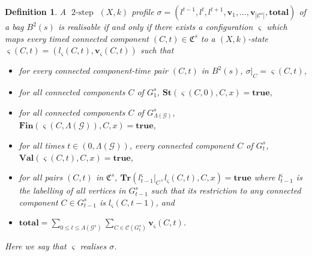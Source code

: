 \documentclass[a4paper,UKenglish,cleveref, autoref, thm-restate]{lipics-v2021} %
\DeclareMathOperator{\twostep}{2-step}
\newcounter{ctheorem}
\newtheorem{defn}[ctheorem]{Definition}
\begin{document}
\begin{toappendix}
\begin{defn}\label{def:realisable}
    A $\twostep$ $(X,k)$ profile $\sigma=(l^{t-1}, l^t, l^{t+1}, \textbf{v}_{1},\ldots,\textbf{v}_{|\mathcal{C}^s|}, \textbf{total})$ of a bag $B^2(s)$ is \emph{realisable} if and only if there exists a configuration $\varsigma$ which maps every timed connected component $(C,t)\in \mathfrak{C}^s$ to a $(X,k)$-state $\varsigma(C,t)=(l_{\varsigma}(C,t),\textbf{v}_{\varsigma}(C,t))$
    such that
    \begin{itemize}
        \item for every connected component-time pair $(C,t)$ in $B^2(s)$, $\sigma|_C=\varsigma(C,t)$,
        \item for all connected components $C$ of $G_1^s$, $\textbf{St}(\varsigma(C,0),C,x)=\textbf{true}$,
        \item for all connected components $C$ of $G^s_{\Lambda(\mathcal{G})}$, $\textbf{Fin}(\varsigma(C,\Lambda(\mathcal{G})),C,x)=\textbf{true}$,
        \item for all times $t\in(0,\Lambda(\mathcal{G}))$, every connected component $C$ of $G_{t}^s$, $\textbf{Val}(\varsigma(C,t),C,x)=\textbf{true}$,
        \item for all pairs $(C,t)$ in $\mathfrak{C}^s$, $\textbf{Tr}(l^{\varsigma}_{t-1}|_C,l_{\varsigma}(C,t),C,x)=\textbf{true}$ where $l^{\varsigma}_{t-1}$ is the labelling of all vertices in $G^s_{t-1}$ such that its restriction to any connected component $C\in G_{t-1}^s$ is $l_{\varsigma}(C,t-1)$, and
        \item $\textbf{total}= \sum_{0\leq t\leq \Lambda(\mathcal{G}^s)} \sum _{C \in \mathcal{C}(G^s_t)} \textbf{v}_{\varsigma}(C,t)$.
    \end{itemize}
    Here we say that $\varsigma$ \emph{realises} $\sigma$.
\end{defn}


\end{toappendix}
\end{document}
